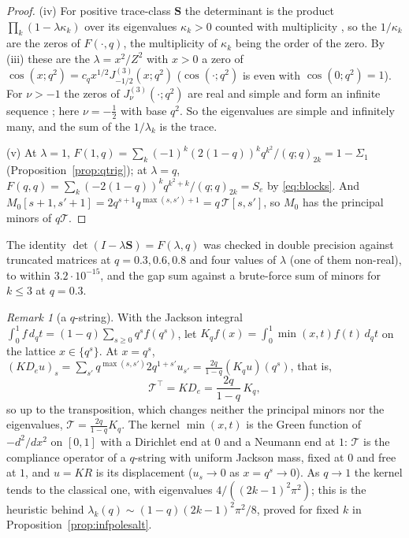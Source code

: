 \documentclass[11pt]{article}
\theoremstyle{plain}
\theoremstyle{definition}
\theoremstyle{remark}
\newtheorem{remark}[theorem]{Remark}
\theoremstyle{plain}\newtheorem*{maintheorem}{Main Theorem}
\begin{document}
\begin{proof}
(iv) For positive trace-class $\mathbf S$ the determinant is the product
$\prod_k(1-\lambda\kappa_k)$ over its eigenvalues $\kappa_k>0$ counted with multiplicity
\cite[Ch.~3]{Simon}, so the $1/\kappa_k$ are the zeros of $F(\cdot,q)$, the multiplicity of
$\kappa_k$ being the order of the zero. By \textup{(iii)} these are the $\lambda=x^2/Z^2$ with $x>0$
a zero of $\cos(x;q^2)=c_qx^{1/2}J^{(3)}_{-1/2}(x;q^2)$ ($\cos(\cdot;q^2)$ is even with
$\cos(0;q^2)=1$). For $\nu>-1$ the zeros of $J^{(3)}_\nu(\cdot;q^2)$ are real and simple and form
an infinite sequence \cite[Cor.~3.2, Lemma~3.3, Thm.~3.4]{KoelinkSwarttouw1994}; here
$\nu=-\tfrac12$ with base $q^2$. So the eigenvalues are simple and infinitely many, and the sum of
the $1/\lambda_k$ is the trace.

(v) At $\lambda=1$, $F(1,q)=\sum_k(-1)^k(2(1-q))^kq^{k^2}/(q;q)_{2k}=1-\Sigma_1$
(Proposition~\ref{prop:qtrig}); at $\lambda=q$, $F(q,q)=\sum_k(-2(1-q))^kq^{k^2+k}/(q;q)_{2k}=S_e$
by \eqref{eq:blocks}. And $M_0[s+1,s'+1]=2q^{s+1}q^{\max(s,s')+1}=q\,\mathcal T[s,s']$, so $M_0$
has the principal minors of $q\mathcal T$.
\end{proof}

\noindent The identity $\det(I-\lambda\mathbf S)=F(\lambda,q)$ was checked in double precision
against truncated matrices at $q=0.3,0.6,0.8$ and four values of $\lambda$ (one of them non-real),
to within $3.2\cdot10^{-15}$, and the gap sum against a brute-force sum of minors for $k\le3$ at
$q=0.3$.

\begin{remark}[a $q$-string]\label{rem:qstring}
With the Jackson integral $\int_0^1f\,d_qt=(1-q)\sum_{s\ge0}q^sf(q^s)$, let
$K_qf(x)=\int_0^1\min(x,t)f(t)\,d_qt$ on the lattice $x\in\{q^s\}$. At $x=q^s$,
$(KD_eu)_s=\sum_{s'}q^{\max(s,s')}2q^{1+s'}u_{s'}=\tfrac{2q}{1-q}(K_qu)(q^s)$, that is,
\[
   \mathcal T^{\!\top}=KD_e=\frac{2q}{1-q}\,K_q ,
\]
so up to the transposition, which changes neither the principal minors nor the eigenvalues,
$\mathcal T=\tfrac{2q}{1-q}K_q$. The kernel $\min(x,t)$ is the Green function of $-d^2/dx^2$ on
$[0,1]$ with a Dirichlet end at $0$ and a Neumann end at $1$: $\mathcal T$ is the compliance operator
of a $q$-string with uniform Jackson mass, fixed at $0$ and free at $1$, and $u=KR$ is its
displacement ($u_s\to0$ as $x=q^s\to0$). As $q\to1$ the kernel tends to the classical one, with
eigenvalues $4/((2k-1)^2\pi^2)$; this is the heuristic behind
$\lambda_k(q)\sim(1-q)(2k-1)^2\pi^2/8$, proved for fixed $k$ in
Proposition~\ref{prop:infpolesalt}.
\end{remark}
\end{document}

